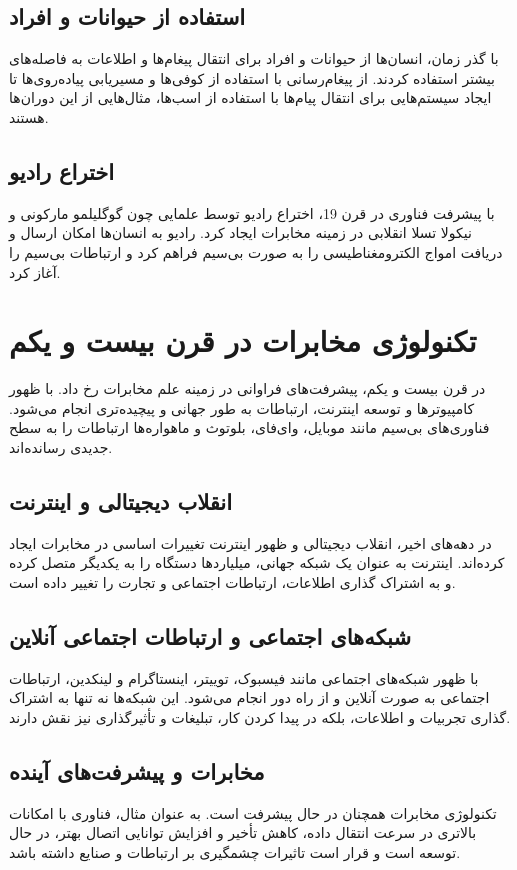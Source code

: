 \subsection{استفاده از حیوانات و افراد}
با گذر زمان، انسان‌ها از حیوانات و افراد برای انتقال پیغام‌ها و اطلاعات به فاصله‌های بیشتر استفاده کردند. از پیغام‌رسانی با استفاده از کوفی‌ها و مسیریابی پیاده‌روی‌ها تا ایجاد سیستم‌هایی برای انتقال پیام‌ها با استفاده از اسب‌ها، مثال‌هایی از این دوران‌ها هستند.

\subsection{اختراع رادیو}
با پیشرفت فناوری در قرن 19، اختراع رادیو توسط علمایی چون گوگلیلمو مارکونی و نیکولا تسلا انقلابی در زمینه مخابرات ایجاد کرد. رادیو به انسان‌ها امکان ارسال و دریافت امواج الکترومغناطیسی را به صورت بی‌سیم فراهم کرد و ارتباطات بی‌سیم را آغاز کرد.

\section{تکنولوژی مخابرات در قرن بیست و یکم}
در قرن بیست و یکم، پیشرفت‌های فراوانی در زمینه علم مخابرات رخ داد. با ظهور کامپیوترها و توسعه اینترنت، ارتباطات به طور جهانی و پیچیده‌تری انجام می‌شود. فناوری‌های بی‌سیم مانند موبایل، وای‌فای، بلوتوث و ماهواره‌ها ارتباطات را به سطح جدیدی رسانده‌اند.

\subsection{انقلاب دیجیتالی و اینترنت}
در دهه‌های اخیر، انقلاب دیجیتالی و ظهور اینترنت تغییرات اساسی در مخابرات ایجاد کرده‌اند. اینترنت به عنوان یک شبکه جهانی، میلیاردها دستگاه را به یکدیگر متصل کرده و به اشتراک گذاری اطلاعات، ارتباطات اجتماعی و تجارت را تغییر داده است.

\subsection{شبکه‌های اجتماعی و ارتباطات اجتماعی آنلاین}
با ظهور شبکه‌های اجتماعی مانند فیسبوک، توییتر، اینستاگرام و لینکدین، ارتباطات اجتماعی به صورت آنلاین و از راه دور انجام می‌شود. این شبکه‌ها نه تنها به اشتراک گذاری تجربیات و اطلاعات، بلکه در پیدا کردن کار، تبلیغات و تأثیرگذاری نیز نقش دارند.

\subsection{مخابرات  و پیشرفت‌های آینده}
تکنولوژی مخابرات همچنان در حال پیشرفت است. به عنوان مثال، فناوری  با امکانات بالاتری در سرعت انتقال داده، کاهش تأخیر و افزایش توانایی اتصال بهتر، در حال توسعه است و قرار است تاثیرات چشمگیری بر ارتباطات و صنایع داشته باشد.


